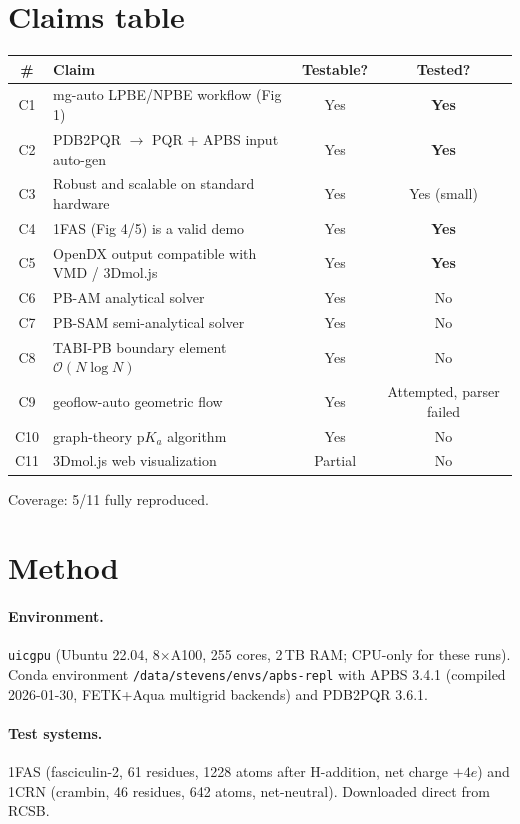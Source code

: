 \documentclass[11pt,letterpaper]{article}
\begin{document}
\section{Claims table}
\begin{center}
\begin{tabular}{clcc}
\toprule
\# & Claim & Testable? & Tested? \\
\midrule
C1  & mg-auto LPBE/NPBE workflow (Fig 1)                & Yes & \textbf{Yes} \\
C2  & PDB2PQR $\rightarrow$ PQR + APBS input auto-gen   & Yes & \textbf{Yes} \\
C3  & Robust and scalable on standard hardware          & Yes & Yes (small)  \\
C4  & 1FAS (Fig 4/5) is a valid demo                    & Yes & \textbf{Yes} \\
C5  & OpenDX output compatible with VMD / 3Dmol.js      & Yes & \textbf{Yes} \\
C6  & PB-AM analytical solver                           & Yes & No           \\
C7  & PB-SAM semi-analytical solver                     & Yes & No           \\
C8  & TABI-PB boundary element $\mathcal{O}(N\log N)$   & Yes & No           \\
C9  & geoflow-auto geometric flow                       & Yes & Attempted, parser failed \\
C10 & graph-theory p$K_a$ algorithm                     & Yes & No           \\
C11 & 3Dmol.js web visualization                        & Partial & No       \\
\bottomrule
\end{tabular}
\end{center}
Coverage: 5/11 fully reproduced.

\section{Method}
\paragraph{Environment.} \texttt{uicgpu} (Ubuntu 22.04, 8$\times$A100, 255 cores, 2\,TB RAM; CPU-only for these runs). Conda environment \texttt{/data/stevens/envs/apbs-repl} with APBS 3.4.1 (compiled 2026-01-30, FETK+Aqua multigrid backends) and PDB2PQR 3.6.1.

\paragraph{Test systems.} 1FAS (fasciculin-2, 61 residues, 1228 atoms after H-addition, net charge $+4e$) and 1CRN (crambin, 46 residues, 642 atoms, net-neutral). Downloaded direct from RCSB.
\end{document}
